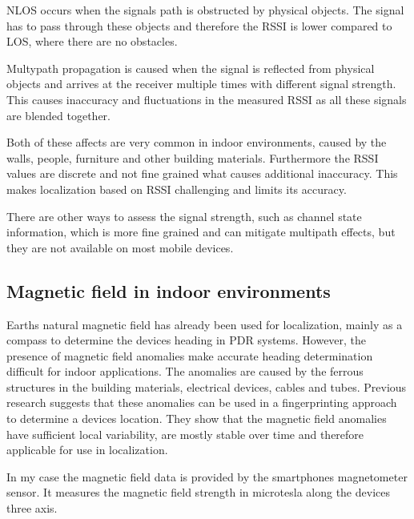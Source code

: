 NLOS occurs when the signals path is obstructed by physical objects. The signal has to pass through these objects and therefore the RSSI is lower compared to LOS, where there are no obstacles\cite{JoseMaster}.

Multypath propagation is caused when the signal is reflected from physical objects and arrives at the receiver multiple times with different signal strength. This causes inaccuracy and fluctuations in the measured RSSI as all these signals are blended together\cite{multipathEffects}.

Both of these affects are very common in indoor environments, caused by the walls, people, furniture and other building materials. Furthermore the RSSI values are discrete and not fine grained what causes additional inaccuracy. This makes localization based on RSSI challenging and limits its accuracy.

There are other ways to assess the signal strength, such as channel state information, which is more fine grained and can mitigate multipath effects, but they are not available on most mobile devices\cite{JoseMaster,FineGrainedIndoorTracking}.


\subsection{Magnetic field in indoor environments}

Earths natural magnetic field has already been used for localization, mainly as a compass to determine the devices heading in PDR systems. However, the presence of magnetic field anomalies make accurate heading determination difficult for indoor applications. The anomalies are caused by the ferrous structures in the building materials, electrical devices, cables and tubes. Previous research suggests that these anomalies can be used in a fingerprinting approach to determine a devices location\cite{haverinen2009global,angermann2012CharacterizationMagnetic,Li2012feasableMagnetic}. They show that the magnetic field anomalies have sufficient local variability, are mostly stable over time and therefore applicable for use in localization.

In my case the magnetic field data is provided by the smartphones magnetometer sensor. It measures the magnetic field strength in microtesla along the devices three axis.\\

